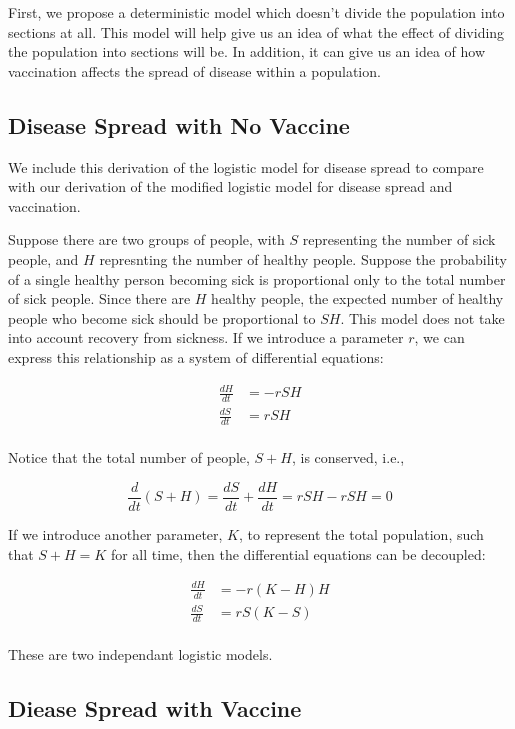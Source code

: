 \documentclass{article}
\begin{document}
First, we propose a deterministic model which doesn't divide the population 
	into sections at all.
This model will help give us an idea of what the effect of dividing
	the population into sections will be.
In addition, it can give us an idea of how vaccination affects the spread of
	disease within a population.

\subsection{Disease Spread with No Vaccine}

We include this derivation of the logistic model for disease spread
	to compare with our derivation of the modified logistic model
	for disease spread and vaccination.

Suppose there are two groups of people, with $S$ representing the number of 
	sick people, and $H$ represnting the number of healthy people.
Suppose the probability of a single healthy person becoming sick is proportional
	only to the total number of sick people.
Since there are $H$ healthy people, the expected number of healthy people
	who become sick should be proportional to $S H$.
This model does not take into account recovery from sickness.
If we introduce a parameter $r$, we can express this relationship as a system
	of differential equations:

\begin{align*}
\frac{dH}{dt} & = - r S H \\
\frac{dS}{dt} & = r S H \\
\end{align*}

Notice that the total number of people, $S + H$, is conserved, i.e.,

\[ \frac{d}{dt} \left( S + H \right) = \frac{dS}{dt} + \frac{dH}{dt}
	= r S H - r S H = 0 \]

If we introduce another parameter, $K$, to represent the total population,
	such that $S + H = K$ for all time, then the differential equations
	can be decoupled:

\begin{align*}
\frac{dH}{dt} & = - r (K - H) H \\
\frac{dS}{dt} & = r S (K - S) \\
\end{align*}

These are two independant logistic models.

\subsection{Diease Spread with Vaccine}
\end{document}
